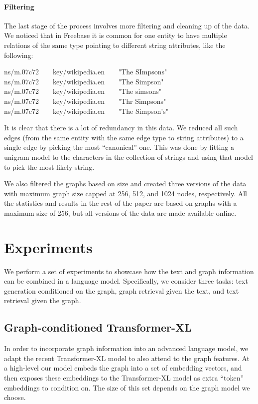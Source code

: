 \documentclass[11pt]{article}
\begin{document}
\paragraph{Filtering}  The last stage of the process involves more filtering and cleaning up of the data.  We noticed that in Freebase it is common for one entity to have multiple relations of the same type pointing to different string attributes, like the following:
\begin{tcolorbox}
{\small
ns/m.07c72~~~~key/wikipedia.en~~~~"The SImpsons" \\
ns/m.07c72~~~~key/wikipedia.en~~~~"The Simpson" \\
ns/m.07c72~~~~key/wikipedia.en~~~~"The simsons" \\
ns/m.07c72~~~~key/wikipedia.en~~~~"Thr Simpsons" \\
ns/m.07c72~~~~key/wikipedia.en~~~~"The Simpson's"}
\end{tcolorbox}
It is clear that there is a lot of redundancy in this data.  We reduced all such edges (from the same entity with the same edge type to string attributes) to a single edge by picking the most ``canonical'' one.  This was done by fitting a unigram model to the characters in the collection of strings and using that model to pick the most likely string.

We also filtered the graphs based on size and created three versions of the data with maximum graph size capped at 256, 512, and 1024 nodes, respectively.  All the statistics and results in the rest of the paper are based on graphs with a maximum size of 256, but all versions of the data are made available online. 

\section{Experiments}

We perform a set of experiments to showcase how the text and graph information can be combined in a language model. Specifically, we consider three tasks: text generation conditioned on the graph, graph retrieval given the text, and text retrieval given the graph.

\subsection{Graph-conditioned Transformer-XL}
In order to incorporate graph information into an advanced language model, we adapt the recent Transformer-XL model \cite{dai2019transformer} to also attend to the graph features.  At a high-level our model embeds the graph into a set of embedding vectors, and then exposes these embeddings to the Transformer-XL model as extra ``token'' embeddings to condition on.  The size of this set depends on the graph model we choose. 
\end{document}
